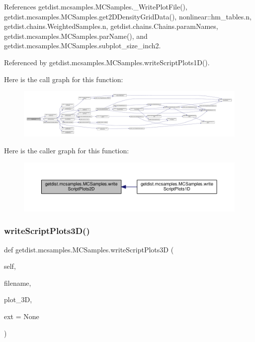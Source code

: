 References getdist.\+mcsamples.\+M\+C\+Samples.\+\_\+\+Write\+Plot\+File(), getdist.\+mcsamples.\+M\+C\+Samples.\+get2\+D\+Density\+Grid\+Data(), nonlinear\+::hm\+\_\+tables.\+n, getdist.\+chains.\+Weighted\+Samples.\+n, getdist.\+chains.\+Chains.\+param\+Names, getdist.\+mcsamples.\+M\+C\+Samples.\+par\+Name(), and getdist.\+mcsamples.\+M\+C\+Samples.\+subplot\+\_\+size\+\_\+inch2.



Referenced by getdist.\+mcsamples.\+M\+C\+Samples.\+write\+Script\+Plots1\+D().

Here is the call graph for this function\+:
\nopagebreak
\begin{figure}[H]
\begin{center}
\leavevmode
\includegraphics[width=350pt]{classgetdist_1_1mcsamples_1_1MCSamples_a23206744ace06726c8026481294f3f63_cgraph}
\end{center}
\end{figure}
Here is the caller graph for this function\+:
\nopagebreak
\begin{figure}[H]
\begin{center}
\leavevmode
\includegraphics[width=350pt]{classgetdist_1_1mcsamples_1_1MCSamples_a23206744ace06726c8026481294f3f63_icgraph}
\end{center}
\end{figure}
\mbox{\label{classgetdist_1_1mcsamples_1_1MCSamples_a244915a2af3b365f1d5f65bde7926e9c}} 
\subsubsection{\texorpdfstring{write\+Script\+Plots3\+D()}{writeScriptPlots3D()}}
{\footnotesize\ttfamily def getdist.\+mcsamples.\+M\+C\+Samples.\+write\+Script\+Plots3D (\begin{DoxyParamCaption}\item[{}]{self,  }\item[{}]{filename,  }\item[{}]{plot\+\_\+3D,  }\item[{}]{ext = {\ttfamily None} }\end{DoxyParamCaption})}

